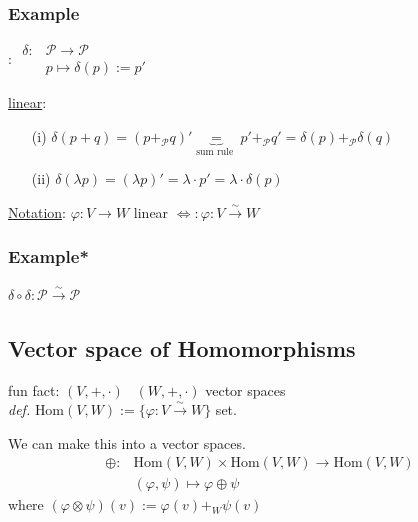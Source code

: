 \documentclass[10pt]{amsart}
\begin{document}
\begin{multicols*}{2}
\subsubsection*{Example}:
$\begin{aligned}
\delta : & \mathcal{P} \to \mathcal{P}  \\
& p \mapsto \delta(p) := p' \end{aligned}$

\underline{linear}: \begin{enumerate}
	\item[(i)] $\delta(p+q) = (p+_{\mathcal{P}} q)' \underbrace{=}_{\text{sum rule }} p' +_{\mathcal{P}} q' = \delta(p) +_{\mathcal{P}} \delta(q) $
	\item[(ii)] $\delta(\lambda p) = (\lambda p)' = \lambda \cdot p'= \lambda \cdot \delta(p)$
\end{enumerate}

\underline{Notation}: $\varphi : V \to W$ linear $\Longleftrightarrow : \varphi : V \xrightarrow{ \sim } W$


\subsubsection{Example*} $\delta \circ \delta : \mathcal{P} \xrightarrow{ \sim } \mathcal{P}$

\subsection{Vector space of Homomorphisms}

fun fact: $(V,+,\cdot)$ \, $(W,+,\cdot)$ vector spaces \\
\qquad \emph{def.} $\text{Hom}(V,W) := \lbrace \varphi : V \xrightarrow{ \sim } W \rbrace$  \qquad set.

We can make this into a vector spaces. 
\[
\begin{aligned}
\oplus  :  &  \text{Hom}(V,W) \times \text{Hom}(V,W) \to \text{Hom}(V,W) \\ 
& (\varphi, \psi) \mapsto \varphi \oplus \psi
\end{aligned}
\]
where $(\varphi \otimes \psi )(v) := \varphi(v) +_W \psi(v)$


\end{multicols*}
\end{document}

